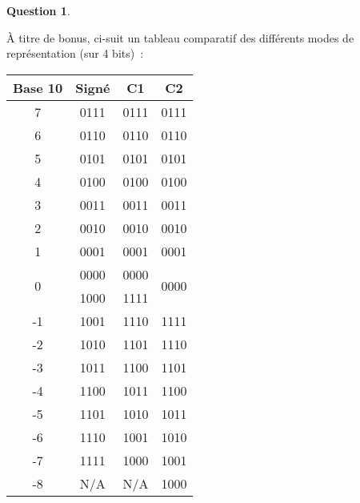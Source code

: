 \documentclass[11pt,a4paper]{article}
\theoremstyle{definition}%
\newtheorem{Q}{Question}[] %
\begin{document}
\begin{Q}
\begin{enumerate}
{		À titre de bonus, ci-suit un tableau comparatif des différents modes de représentation (sur 4 bits)~:
		\begin{center}
			\begin{tabular}{|c|c|c|c|} \hline
				Base 10 & Signé & C1 & C2 \\ \hline
				7 & 0111 & 0111 & 0111 \\ \hline
				6 & 0110 & 0110 & 0110 \\ \hline
				5 & 0101 & 0101 & 0101 \\ \hline
				4 & 0100 & 0100 & 0100 \\ \hline
				3 & 0011 & 0011 & 0011 \\ \hline
				2 & 0010 & 0010 & 0010 \\ \hline
				1 & 0001 & 0001 & 0001 \\ \hline
				\multirow{2}{*}{0} & 0000 & 0000 & \multirow{2}{*}{0000} \\
				& 1000 & 1111 & \\ \hline
				-1 & 1001 & 1110 & 1111 \\ \hline
				-2 & 1010 & 1101 & 1110 \\ \hline
				-3 & 1011 & 1100 & 1101 \\ \hline
				-4 & 1100 & 1011 & 1100 \\ \hline
				-5 & 1101 & 1010 & 1011 \\ \hline
				-6 & 1110 & 1001 & 1010 \\ \hline
				-7 & 1111 & 1000 & 1001 \\ \hline
				-8 & N/A & N/A & 1000 \\ \hline
			\end{tabular}
		\end{center}
	}
\end{enumerate}
\end{Q}
\end{document}
